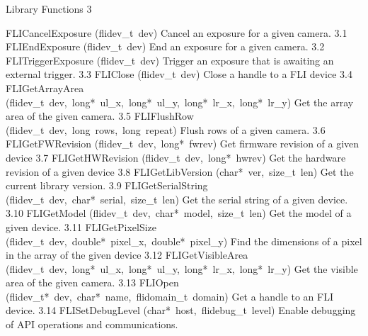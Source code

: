 \documentclass{article}
\begin{document}
\begin{cxxentry}
{}
        {Library Functions }
        {}
        {}
        {3}
\begin{cxxnames}
        {FLICancelExposure}
        {(flidev\_t\ dev)}
        { Cancel an exposure for a given camera.}
        {3.1}
        {FLIEndExposure}
        {(flidev\_t\ dev)}
        { End an exposure for a given camera.}
        {3.2}
        {FLITriggerExposure}
        {(flidev\_t\ dev)}
        { Trigger an exposure that is awaiting an external trigger.}
        {3.3}
        {FLIClose}
        {(flidev\_t\ dev)}
        { Close a handle to a FLI device  }
        {3.4}
        {FLIGetArrayArea}
        {(flidev\_t\ dev,\ long*\ ul\_x,\ long*\ ul\_y,\ long*\ lr\_x,\ long*\ lr\_y)}
        { Get the array area of the given camera.}
        {3.5}
        {FLIFlushRow}
        {(flidev\_t\ dev,\ long\ rows,\ long\ repeat)}
        { Flush rows of a given camera.}
        {3.6}
        {FLIGetFWRevision}
        {(flidev\_t\ dev,\ long*\ fwrev)}
        { Get firmware revision of a given device  }
        {3.7}
        {FLIGetHWRevision}
        {(flidev\_t\ dev,\ long*\ hwrev)}
        { Get the hardware revision of a given device  }
        {3.8}
        {FLIGetLibVersion}
        {(char*\ ver,\ size\_t\ len)}
        { Get the current library version.}
        {3.9}
        {FLIGetSerialString}
        {(flidev\_t\ dev,\ char*\ serial,\ size\_t\ len)}
        { Get the serial string of a given device.}
        {3.10}
        {FLIGetModel}
        {(flidev\_t\ dev,\ char*\ model,\ size\_t\ len)}
        { Get the model of a given device.}
        {3.11}
        {FLIGetPixelSize}
        {(flidev\_t\ dev,\ double*\ pixel\_x,\ double*\ pixel\_y)}
        { Find the dimensions of a pixel in the array of the given device  }
        {3.12}
        {FLIGetVisibleArea}
        {(flidev\_t\ dev,\ long*\ ul\_x,\ long*\ ul\_y,\ long*\ lr\_x,\ long*\ lr\_y)}
        { Get the visible area of the given camera.}
        {3.13}
        {FLIOpen}
        {(flidev\_t*\ dev,\ char*\ name,\ flidomain\_t\ domain)}
        { Get a handle to an FLI device.}
        {3.14}
        {FLISetDebugLevel}
        {(char*\ host,\ flidebug\_t\ level)}
        { Enable debugging of API operations and communications.}

\end{cxxnames}
\end{cxxentry}
\end{document}
